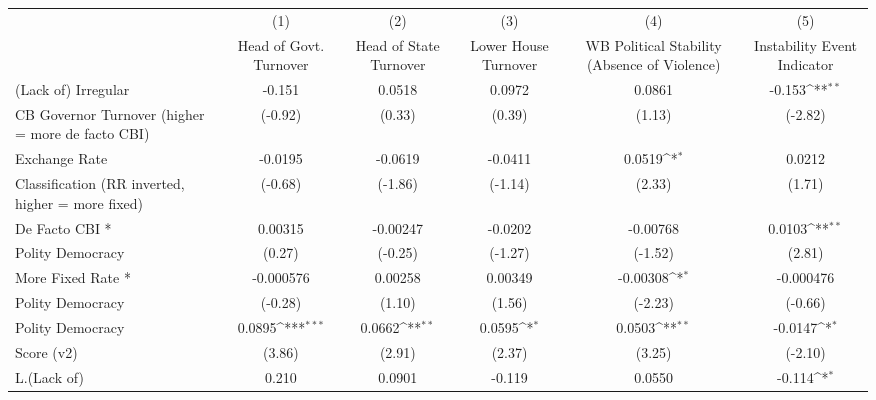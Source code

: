 {
\def\sym#1{\ifmmode^{#1}\else\(^{#1}\)\fi}
\begin{tabular}{l*{5}{c}}
\hline\hline
                    &\multicolumn{1}{c}{(1)}&\multicolumn{1}{c}{(2)}&\multicolumn{1}{c}{(3)}&\multicolumn{1}{c}{(4)}&\multicolumn{1}{c}{(5)}\\
                    &\multicolumn{1}{c}{Head of Govt. Turnover}&\multicolumn{1}{c}{Head of State Turnover}&\multicolumn{1}{c}{Lower House Turnover}&\multicolumn{1}{c}{WB Political Stability (Absence of Violence)}&\multicolumn{1}{c}{Instability Event Indicator}\\
\hline
(Lack of) Irregular &      -0.151         &      0.0518         &      0.0972         &      0.0861         &      -0.153\sym{**} \\
CB Governor Turnover (higher = more de facto CBI)&     (-0.92)         &      (0.33)         &      (0.39)         &      (1.13)         &     (-2.82)         \\
[1em]
Exchange Rate       &     -0.0195         &     -0.0619         &     -0.0411         &      0.0519\sym{*}  &      0.0212         \\
Classification (RR inverted, higher = more fixed)&     (-0.68)         &     (-1.86)         &     (-1.14)         &      (2.33)         &      (1.71)         \\
[1em]
De Facto CBI *      &     0.00315         &    -0.00247         &     -0.0202         &    -0.00768         &      0.0103\sym{**} \\
Polity Democracy    &      (0.27)         &     (-0.25)         &     (-1.27)         &     (-1.52)         &      (2.81)         \\
[1em]
More Fixed Rate *   &   -0.000576         &     0.00258         &     0.00349         &    -0.00308\sym{*}  &   -0.000476         \\
Polity Democracy    &     (-0.28)         &      (1.10)         &      (1.56)         &     (-2.23)         &     (-0.66)         \\
[1em]
Polity Democracy    &      0.0895\sym{***}&      0.0662\sym{**} &      0.0595\sym{*}  &      0.0503\sym{**} &     -0.0147\sym{*}  \\
Score (v2)          &      (3.86)         &      (2.91)         &      (2.37)         &      (3.25)         &     (-2.10)         \\
[1em]
L.(Lack of)         &       0.210         &      0.0901         &      -0.119         &      0.0550         &      -0.114\sym{*}  \\

\end{tabular}}
